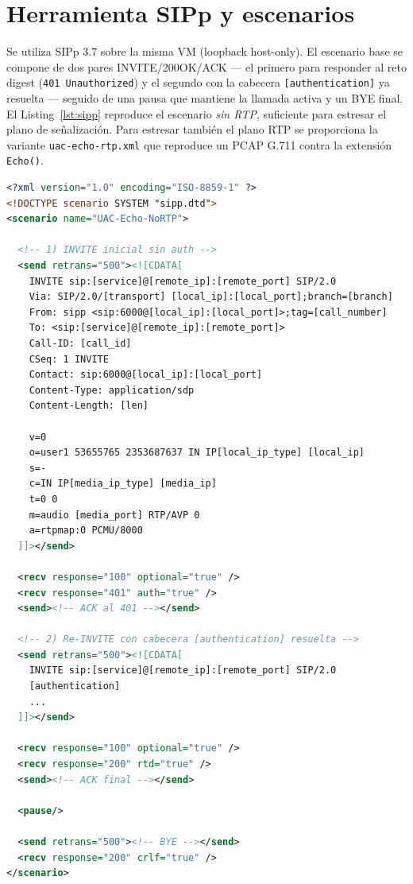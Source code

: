 \documentclass[conference]{IEEEtran}
\begin{document}
\FloatBarrier
\section{Herramienta SIPp y escenarios}

Se utiliza SIPp 3.7 \cite{ref_sipp} sobre la misma VM (loopback
host-only). El
escenario base se compone de dos pares INVITE/200OK/ACK --- el primero
para responder al reto digest (\texttt{401 Unauthorized}) y el segundo
con la cabecera \texttt{[authentication]} ya resuelta --- seguido de
una pausa que mantiene la llamada activa y un BYE final. El
Listing~\ref{lst:sipp} reproduce el escenario \textit{sin RTP},
suficiente para estresar el plano de se\~nalizaci\'on. Para estresar
tambi\'en el plano RTP se proporciona la variante
\texttt{uac-echo-rtp.xml} que reproduce un PCAP G.711 contra la
extensi\'on \texttt{Echo()}.

\begin{lstlisting}[language=XML,caption={\texttt{uac-echo-no-rtp.xml}: escenario UAC con digest (esqueleto).},label=lst:sipp]
<?xml version="1.0" encoding="ISO-8859-1" ?>
<!DOCTYPE scenario SYSTEM "sipp.dtd">
<scenario name="UAC-Echo-NoRTP">

  <!-- 1) INVITE inicial sin auth -->
  <send retrans="500"><![CDATA[
    INVITE sip:[service]@[remote_ip]:[remote_port] SIP/2.0
    Via: SIP/2.0/[transport] [local_ip]:[local_port];branch=[branch]
    From: sipp <sip:6000@[local_ip]:[local_port]>;tag=[call_number]
    To: <sip:[service]@[remote_ip]:[remote_port]>
    Call-ID: [call_id]
    CSeq: 1 INVITE
    Contact: sip:6000@[local_ip]:[local_port]
    Content-Type: application/sdp
    Content-Length: [len]

    v=0
    o=user1 53655765 2353687637 IN IP[local_ip_type] [local_ip]
    s=-
    c=IN IP[media_ip_type] [media_ip]
    t=0 0
    m=audio [media_port] RTP/AVP 0
    a=rtpmap:0 PCMU/8000
  ]]></send>

  <recv response="100" optional="true" />
  <recv response="401" auth="true" />
  <send><!-- ACK al 401 --></send>

  <!-- 2) Re-INVITE con cabecera [authentication] resuelta -->
  <send retrans="500"><![CDATA[
    INVITE sip:[service]@[remote_ip]:[remote_port] SIP/2.0
    [authentication]
    ...
  ]]></send>

  <recv response="100" optional="true" />
  <recv response="200" rtd="true" />
  <send><!-- ACK final --></send>

  <pause/>

  <send retrans="500"><!-- BYE --></send>
  <recv response="200" crlf="true" />
</scenario>
\end{lstlisting}
\end{document}
